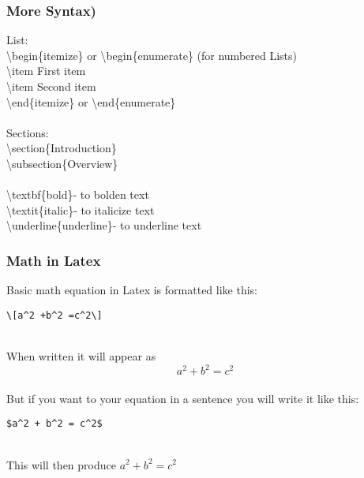 \documentclass[aspectratio=1610]{beamer}
\begin{document}
\begin{frame}[fragile]
    \frametitle{More Syntax)}
    List: 
    \\
    \textbackslash{}begin\{itemize\} or \textbackslash{}begin\{enumerate\} (for numbered Lists)
    \\
    \textbackslash{}item First item
    \\
    \textbackslash{}item Second item
    \\
    \textbackslash{}end\{itemize\} or \textbackslash{}end\{enumerate\}
        \\ ~ \\
    Sections:
    \\
    \textbackslash{}section\{Introduction\}
    \\
    \textbackslash{}subsection\{Overview\}
           \\ ~ \\
    \textbackslash{}textbf\{bold\}- to bolden text
    \\
    \textbackslash{}textit\{italic\}- to italicize text
    \\
    \textbackslash{}underline\{underline\}- to underline text
\end{frame}

\begin{frame}[fragile]
    \frametitle{Math in Latex}
    Basic math equation in Latex is formatted like this:
    \\
\begin{verbatim}
\[a^2 +b^2 =c^2\] 
\end{verbatim}
\\
When written it will appear as \[a^2 +b^2 =c^2\]    
    \\
    But if you want to your equation in a sentence you will write it like this:
    \\
\begin{verbatim}
$a^2 + b^2 = c^2$
\end{verbatim}    
\\
This will then produce $a^2+b^2=c^2$
\end{frame}
\end{document}
